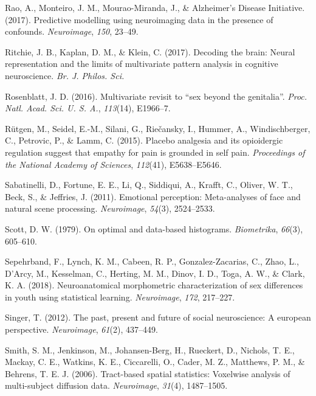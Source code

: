 \documentclass[12pt,american,a4paper,oneside,]{memoir} %
\begin{document}
\leavevmode\hypertarget{ref-Rao2017-bw}{}%
Rao, A., Monteiro, J. M., Mourao-Miranda, J., \& Alzheimer's Disease Initiative. (2017). Predictive modelling using neuroimaging data in the presence of confounds. \emph{Neuroimage}, \emph{150}, 23--49.

\leavevmode\hypertarget{ref-Ritchie2017-gl}{}%
Ritchie, J. B., Kaplan, D. M., \& Klein, C. (2017). Decoding the brain: Neural representation and the limits of multivariate pattern analysis in cognitive neuroscience. \emph{Br. J. Philos. Sci.}

\leavevmode\hypertarget{ref-Rosenblatt2016-oy}{}%
Rosenblatt, J. D. (2016). Multivariate revisit to ``sex beyond the genitalia''. \emph{Proc. Natl. Acad. Sci. U. S. A.}, \emph{113}(14), E1966--7.

\leavevmode\hypertarget{ref-rutgen2015placebo}{}%
Rütgen, M., Seidel, E.-M., Silani, G., Riečansky, I., Hummer, A., Windischberger, C., Petrovic, P., \& Lamm, C. (2015). Placebo analgesia and its opioidergic regulation suggest that empathy for pain is grounded in self pain. \emph{Proceedings of the National Academy of Sciences}, \emph{112}(41), E5638--E5646.

\leavevmode\hypertarget{ref-sabatinelli2011emotional}{}%
Sabatinelli, D., Fortune, E. E., Li, Q., Siddiqui, A., Krafft, C., Oliver, W. T., Beck, S., \& Jeffries, J. (2011). Emotional perception: Meta-analyses of face and natural scene processing. \emph{Neuroimage}, \emph{54}(3), 2524--2533.

\leavevmode\hypertarget{ref-scott1979optimal}{}%
Scott, D. W. (1979). On optimal and data-based histograms. \emph{Biometrika}, \emph{66}(3), 605--610.

\leavevmode\hypertarget{ref-Sepehrband2018-dy}{}%
Sepehrband, F., Lynch, K. M., Cabeen, R. P., Gonzalez-Zacarias, C., Zhao, L., D'Arcy, M., Kesselman, C., Herting, M. M., Dinov, I. D., Toga, A. W., \& Clark, K. A. (2018). Neuroanatomical morphometric characterization of sex differences in youth using statistical learning. \emph{Neuroimage}, \emph{172}, 217--227.

\leavevmode\hypertarget{ref-singer2012past}{}%
Singer, T. (2012). The past, present and future of social neuroscience: A european perspective. \emph{Neuroimage}, \emph{61}(2), 437--449.

\leavevmode\hypertarget{ref-Smith2006-sf}{}%
Smith, S. M., Jenkinson, M., Johansen-Berg, H., Rueckert, D., Nichols, T. E., Mackay, C. E., Watkins, K. E., Ciccarelli, O., Cader, M. Z., Matthews, P. M., \& Behrens, T. E. J. (2006). Tract-based spatial statistics: Voxelwise analysis of multi-subject diffusion data. \emph{Neuroimage}, \emph{31}(4), 1487--1505.
\end{document}
